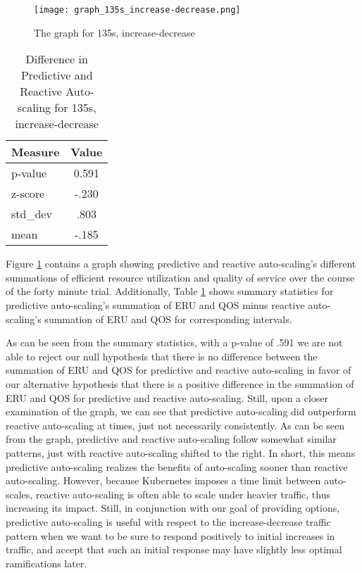 \begin{figure}[!h]
  \centerline{\texttt{[image: graph\_135s\_increase-decrease.png]}}
  \caption{The graph for 135s, increase-decrease}
  \label{fig:135s-increase-decrease}
\end{figure}

\begin{table}[htbp]
  \centering
  \caption{Difference in Predictive and Reactive Auto-scaling for 135s, increase-decrease}
  \label{tab:135s-increase-decrease}
\begin{tabular}{l c}\hline\hline
    \multicolumn{1}{c}{\textbf{Measure}} & \textbf{Value} \\ \hline
     p-value & 0.591 \\
     z-score & -.230 \\
     std\_dev & .803 \\
     mean & -.185
  \end{tabular}
\end{table}

Figure \ref{fig:135s-increase-decrease} contains a graph
showing predictive and reactive auto-scaling's different
summations of efficient resource utilization and quality of service over the
course of the forty minute trial. Additionally, Table
\ref{tab:135s-increase-decrease} shows summary statistics for predictive
auto-scaling's summation of ERU and QOS minus reactive auto-scaling's summation
of ERU and QOS for corresponding intervals.

As can be seen from the summary statistics, with a p-value of .591 we are not
able to reject our null hypothesis that there is no difference between the
summation of ERU and QOS for predictive and reactive auto-scaling in favor of
our alternative hypothesis that there is a positive difference in the summation
of ERU and QOS for predictive and reactive auto-scaling. Still, upon a closer
examination of the graph, we can see that predictive auto-scaling did outperform
reactive auto-scaling at times, just not necessarily consistently. As can be
seen from the graph, predictive and reactive auto-scaling follow somewhat
similar patterns, just with reactive auto-scaling shifted to the right. In
short, this means predictive auto-scaling realizes the benefits of auto-scaling
sooner than reactive auto-scaling. However, because Kubernetes imposes a time
limit between auto-scales, reactive auto-scaling is often able to scale under
heavier traffic, thus increasing its impact. Still, in conjunction with our goal
of providing options, predictive auto-scaling is useful with respect to
the increase-decrease traffic pattern when we want to be sure to respond
positively to initial increases in traffic, and accept that such an initial
response may have slightly less optimal ramifications later.
